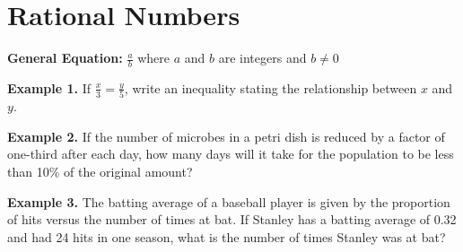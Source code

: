 \section{Rational Numbers}

\bigskip
\textbf{General Equation:} $\frac{a}{b}$ where $a$ and $b$ are integers and $b\neq0$

\vfill
\textbf{Example 1.} If $\frac{x}{3}=\frac{y}{5}$, write an inequality stating the relationship between $x$ and $y$.

\vfill
\textbf{Example 2.} If the number of microbes in a petri dish is reduced by a factor of one-third after each day, how many days will it take for the population to be less than 10\% of the original amount?

\vfill
\textbf{Example 3.} The batting average of a baseball player is given by the proportion of hits versus the number of times at bat. If Stanley has a batting average of 0.32 and had 24 hits in one season, what is the number of times Stanley was at bat?

